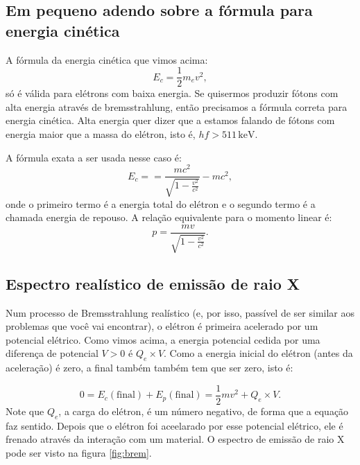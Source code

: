 \documentclass{article}
\begin{document}
\subsection{Em pequeno adendo sobre a f\'ormula para energia cin\'etica}

A f\'ormula da energia cin\'etica que vimos acima:
\begin{equation}
E_c = \frac{1}{2}m_ev^2,
\end{equation}
s\'o \'e v\'alida para el\'etrons com baixa energia. Se quisermos produzir f\'otons com alta energia atrav\'es de bremsstrahlung, ent\~ao precisamos a f\'ormula correta para energia cin\'etica. Alta energia quer dizer que a estamos falando de f\'otons com energia maior que a massa do el\'etron, isto \'e, $hf > 511\,\text{keV}$.

A f\'ormula exata a ser usada nesse caso \'e:
\begin{equation}
E_c = = \frac{mc^{2}}{\sqrt{1-\frac{v^2}{c^2}}} - mc^2,
\end{equation}
onde o primeiro termo \'e a energia total do el\'etron e o segundo termo \'e a chamada energia de repouso. A rela\c c\~ao equivalente para o momento linear \'e:
\begin{equation}
p = \frac{mv}{\sqrt{1-\frac{v^2}{c^2}}}.
\end{equation}

\subsection{Espectro real\'istico de emissão de raio X}
Num processo de Bremsstrahlung real\'istico (e, por isso, pass\'ivel de ser similar aos problemas que voc\^e vai encontrar), o el\'etron \'e primeira acelerado por um potencial el\'etrico. Como vimos acima, a energia potencial cedida por uma diferen\c ca de potencial $V>0$ \'e $Q_e\times V$. Como a energia inicial do el\'etron (antes da acelera\c c\~ao) \'e zero, a final tamb\'em tamb\'em tem que ser zero, isto \'e:

\begin{equation}
0 = E_c(\text{final}) + E_p(\text{final}) = \frac{1}{2}mv^2 + Q_e\times V.
\end{equation}
Note que $Q_e$, a carga do el\'etron, \'e um n\'umero negativo, de forma que a equa\c c\~ao faz sentido. Depois que o el\'etron foi aceelarado por esse potencial el\'etrico, ele \'e frenado atrav\'es da intera\c c\~ao com um material. O espectro de emiss\~ao de raio X pode ser visto na figura \ref{fig:brem}.
\end{document}
